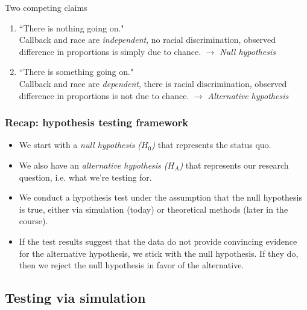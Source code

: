 \documentclass[notes,11pt, aspectratio=169]{beamer}
\newcommand{\hl}[1]{\textit{\textcolor{hlblue}{#1}}}
\begin{document}
\begin{frame}{Two competing claims}

\begin{enumerate}

\item ``There is nothing going on." \\
Callback and race are \hl{independent}, no racial discrimination, observed difference in proportions is simply due to chance. $\rightarrow$ \hl{Null hypothesis}

\pause

\item ``There is something going on." \\
Callback and race are \hl{dependent}, there is racial discrimination, observed difference in proportions is not due to chance. $\rightarrow$ \hl{Alternative hypothesis}

\end{enumerate}
\end{frame}

\begin{frame}
\frametitle{Recap: hypothesis testing framework}

\begin{itemize}
\item We start with a \hl{null hypothesis ($H_0$)} that represents the status quo.
\item We also have an \hl{alternative hypothesis ($H_A$)} that represents our research question, i.e. what we're testing for.
\item We conduct a hypothesis test under the assumption that the null hypothesis is true, either via simulation (today) or theoretical methods (later in the course).
\item If the test results suggest that the data do not provide convincing evidence for the alternative hypothesis, we stick with the null hypothesis. If they do, then we reject the null hypothesis in favor of the alternative.
\end{itemize}
\end{frame}
\subsection{Testing via simulation}

\end{document}
